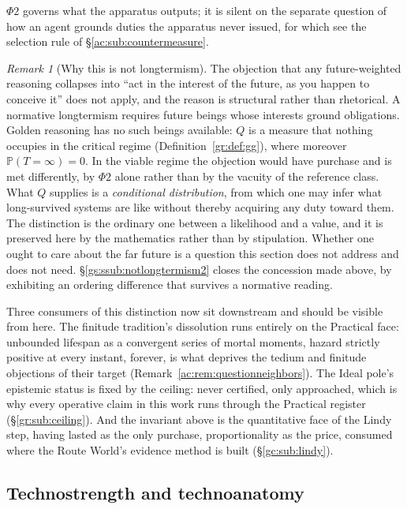 \documentclass[11pt]{article}
\numberwithin{equation}{section}
\theoremstyle{plain}
\theoremstyle{definition}
\theoremstyle{remark}
\newtheorem{remark}[theorem]{Remark}
\newcommand{\PP}{\mathbb{P}}
\begin{document}
\noindent $\Phi2$ governs what the apparatus outputs; it is silent on the
separate question of how an agent grounds duties the apparatus never
issued, for which see the selection rule of
\S\ref{ac:sub:countermeasure}.

\begin{remark}[Why this is not longtermism]\label{gr:rem:notlongtermism}
The objection that any future-weighted reasoning collapses into ``act in
the interest of the future, as you happen to conceive it'' does not
apply, and the reason is structural rather than rhetorical. A normative
longtermism requires future beings whose interests ground obligations.
Golden reasoning has no such beings available: $Q$ is a measure that
nothing occupies in the critical regime
(Definition~\ref{gr:def:gg}), where moreover $\PP(T=\infty)=0$. In the
viable regime the objection would have purchase and is met differently,
by $\Phi2$ alone rather than by the vacuity of the reference class. What $Q$ supplies is a
\emph{conditional distribution}, from which one may infer what
long-survived systems are like without thereby acquiring any duty toward
them. The distinction is the ordinary one between a likelihood and a
value, and it is preserved here by the mathematics rather than by
stipulation. Whether one ought to care about the far future is a
question this section does not address and does not need.
\S\ref{gs:ssub:notlongtermism2} closes the concession made above, by
exhibiting an ordering difference that survives a normative reading.
\end{remark}

Three consumers of this distinction now sit downstream and should be
visible from here. The finitude tradition's dissolution runs
entirely on the Practical face: unbounded lifespan as a convergent
series of mortal moments, hazard strictly positive at every
instant, forever, is what deprives the tedium and finitude
objections of their target (Remark~\ref{ac:rem:questionneighbors}).
The Ideal pole's epistemic status is fixed by the ceiling: never
certified, only approached, which is why every operative claim in
this work runs through the Practical register
(\S\ref{gr:sub:ceiling}). And the invariant above is the
quantitative face of the Lindy step, having lasted as the only
purchase, proportionality as the price, consumed where the Route
World's evidence method is built (\S\ref{gc:sub:lindy}).

\subsection{Technostrength and technoanatomy}\label{gr:sub:coords}
\end{document}
